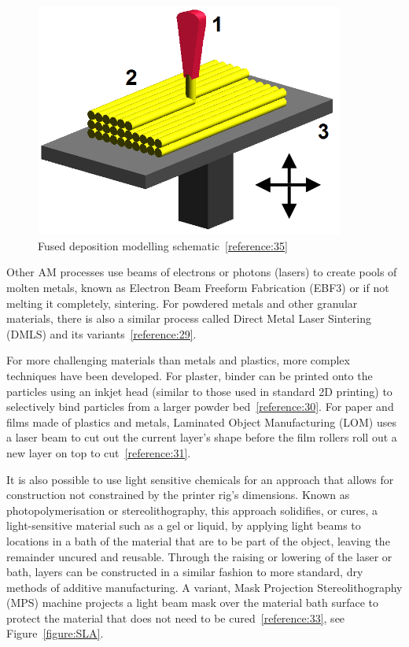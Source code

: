 \documentclass[11pt]{report} %
\begin{document}
\begin{figure}[H]
  \centering
  \includegraphics[width=4in]{FDM_by_Zureks.png}
  \caption{Fused deposition modelling schematic~\ref{reference:35}}
  \label{figure:FDM}
\end{figure}

Other AM processes use beams of electrons or photons (lasers) to create pools of molten metals, known as Electron Beam Freeform Fabrication (EBF3) or if not melting it completely, sintering. For powdered metals and other granular materials, there is also a similar process called Direct Metal Laser Sintering (DMLS) and its variants~\ref{reference:29}.

For more challenging materials than metals and plastics, more complex techniques have been developed. For plaster, binder can be printed onto the particles using an inkjet head (similar to those used in standard 2D printing) to selectively bind particles from a larger powder bed~\ref{reference:30}. For paper and films made of plastics and metals, Laminated Object Manufacturing (LOM) uses a laser beam to cut out the current layer's shape before the film rollers roll out a new layer on top to cut~\ref{reference:31}.

It is also possible to use light sensitive chemicals for an approach that allows for construction not constrained by the printer rig's dimensions. Known as photopolymerisation or stereolithography, this approach solidifies, or cures, a light-sensitive material such as a gel or liquid, by applying light beams to locations in a bath of the material that are to be part of the object, leaving the remainder uncured and reusable. Through the raising or lowering of the laser or bath, layers can be constructed in a similar fashion to more standard, dry methods of additive manufacturing. A variant, Mask Projection Stereolithography (MPS) machine projects a light beam mask over the material bath surface to protect the material that does not need to be cured~\ref{reference:33}, see Figure~\ref{figure:SLA}.
\end{document}
